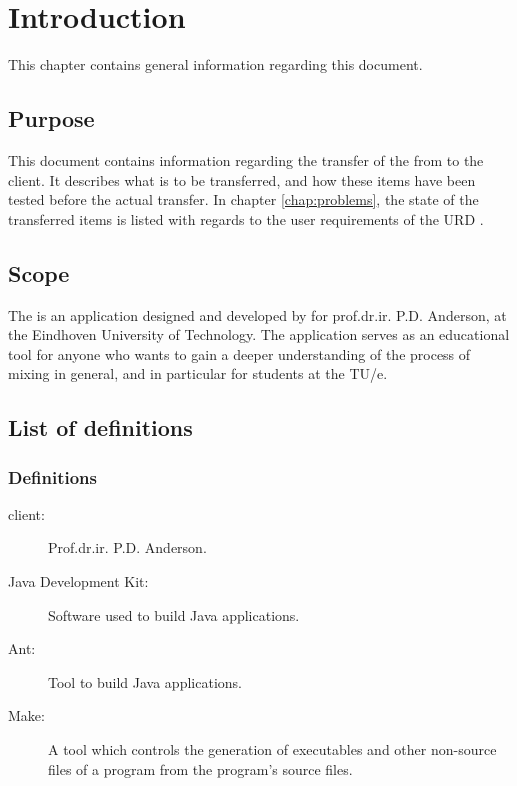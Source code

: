 \chapter{Introduction}
This chapter contains general information regarding this document.

\section{Purpose}
This document contains information regarding the transfer of the \applicationname{} from \projectauthor{} to the client. It describes what is to be transferred, and how these items have been tested before the actual transfer. In chapter \ref{chap:problems}, the state of the transferred items is listed with regards to the user requirements of the URD \cite{urd}.

\section{Scope}
The \applicationname{} is an application designed and developed by \projectauthor{} for prof.dr.ir. P.D. Anderson, at the Eindhoven University of Technology. The application serves as an educational tool for anyone who wants to gain a deeper understanding of the process of mixing in general, and in particular for students at the TU/e.

\section{List of definitions}
\subsection{Definitions}
\begin{description}
\item[client:] Prof.dr.ir. P.D. Anderson.
\item[Java Development Kit:] Software used to build Java applications.
\item[Ant:] Tool to build Java applications.
\item[Make:] A tool which controls the generation of executables and other non-source files of a program from the program's source files.
\end{description}

